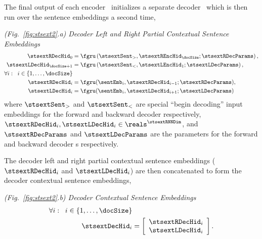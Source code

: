 The final output of each encoder \gru~initializes a separate decoder \gru~which is then run over the sentence embeddings a second time, 


\vspace{10pt} \noindent  \textit{(Fig.~\ref{fig:stsext2}.a) Decoder Left and Right Partial Contextual Sentence Embeddings}
\begin{align}
\stsextRDecHid_0 & = \fgru\left(\stsextSent_>,   \stsextREncHid_\docSize; \stsextRDecParams\right),\\ 
\stsextLDecHid_{\docSize+1} & = \fgru\left(\stsextSent_<, \stsextLEncHid_1;\stsextLDecParams\right),\\ 
    \forall i : \;\; i \in \{1,\ldots,\docSize\}& \nonumber\\
        \stsextRDecHid_i & = \fgru(
            \sentEmb_i,  \stsextRDecHid_{i-1}; 
            \stsextRDecParams), \\
        \stsextLDecHid_i & = \fgru(
            \sentEmb_i,  \stsextLDecHid_{i+1}; 
            \stsextLDecParams) 
\end{align}
where $\stsextSent_>$ and $\stsextSent_<$ are special ``begin decoding'' input
embeddings for the forward and backward decoder respectively, 
$\stsextRDecHid_i, \stsextLDecHid_i \in \reals^{\stsextRNNDim}$, 
and $\stsextRDecParams$ and $\stsextLDecParams$ are the parameters for the
forward and backward decoder \gru s respectively.
%

The decoder left and right partial contextual sentence embeddings ($\stsextRDecHid_i$ and $\stsextLDecHid_i$) are then
concatenated to form the decoder contextual sentence embeddings,


\vspace{10pt} \noindent \textit{(Fig.~\ref{fig:stsext2}.b) Decoder Contextual Sentence Embeddings} 
\begin{align}
    \forall i : \;\; i \in \{1,\ldots,\docSize\}& \nonumber \\
        \stsextDecHid_i & = \left[\begin{array}{c}
            \stsextRDecHid_i\\ 
            \stsextLDecHid_i\end{array}\right].
\end{align}







